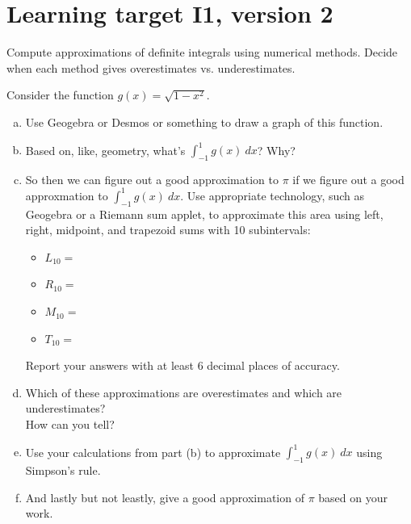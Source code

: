 
\pagebreak



\section{Learning target I1, version 2}
Compute approximations of definite integrals using numerical methods. Decide when each method gives overestimates vs. underestimates.

\hrulefill

Consider the function \(g(x)=\sqrt{1-x^2}\). 

\begin{enumerate}[(a)]
  \item Use Geogebra or Desmos or something to draw a graph of this function.
  \item Based on, like, geometry, what's \(\displaystyle\int_{-1}^1 g(x)\ dx\)? Why?
  \vfill

  \item So then we can figure out a good approximation to \(\pi\) if we figure out a good approxmation to \(\int_{-1}^1 g(x)\ dx\). Use appropriate technology, such as Geogebra or a Riemann sum applet, to approximate this area using left, right, midpoint, and trapezoid sums with 10 subintervals:
  \begin{itemize}
    \item $L_{10}=$
    \item $R_{10}=$
    \item $M_{10}=$
    \item $T_{10}=$
  \end{itemize}
  Report your answers with at least 6 decimal places of accuracy.
  
  \item Which of these approximations are overestimates and which are underestimates? \\
  How can you tell?
  \vfill

  \item Use your calculations from part (b) to approximate \(\displaystyle\int_{-1}^1 g(x)\ dx\) using Simpson's rule.

  \vfill
  \item And lastly but not leastly, give a good approximation of \(\pi\) based on your work.
\end{enumerate}
\pagebreak

